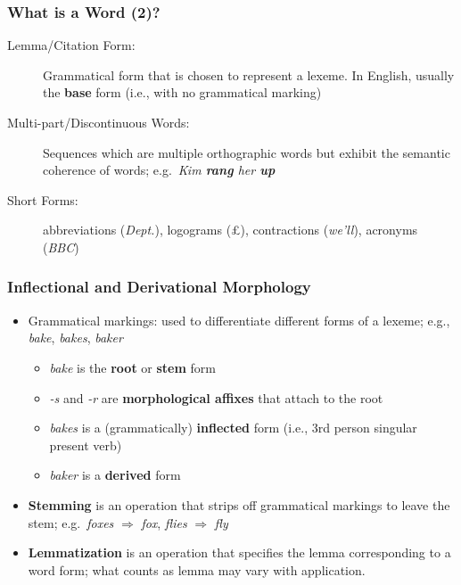 \begin{frame}[fragile]
  \frametitle{What is a Word (2)?}

    \begin{description}
      \item[Lemma/Citation Form:] Grammatical form that is chosen to
        represent a lexeme. In English, usually the \textbf{base} form
        (i.e., with no grammatical marking)

      \item[Multi-part/Discontinuous Words:] Sequences which are
        multiple orthographic words but exhibit the semantic coherence
        of words; e.g.\ \textit{Kim
          \textbf{rang} her \textbf{up}}

        \item[Short Forms:] abbreviations (\textit{Dept.}), logograms
        (\pounds), contractions (\textit{we'll}), acronyms (\textit{BBC})
    \end{description}
 
\end{frame}

\begin{frame}[fragile]
  \frametitle{Inflectional and Derivational Morphology}

  \begin{itemize}
    \item Grammatical markings: used to differentiate different forms
      of a lexeme; e.g., \textit{bake}, \textit{bakes}, \textit{baker}
 

      \begin{itemize}
      \item \textit{bake} is the \textbf{root} or \textbf{stem}
        form
      \item \textit{-s} and \textit{-r} are \textbf{morphological
          affixes} that attach to the root
      \item \textit{bakes} is a (grammatically) \textbf{inflected}
        form (i.e., 3rd person singular present verb)
      \item \textit{baker} is a \textbf{derived} form
      \end{itemize}

    \item \textbf{Stemming} is an operation that strips off
      grammatical markings to leave the stem; e.g.\ \textit{foxes}
      $\Rightarrow$ \textit{fox},  \textit{flies}
      $\Rightarrow$ \textit{fly}

    \item \textbf{Lemmatization} is an operation that specifies the
      lemma corresponding to a word form; what counts as lemma may
      vary with application.
    \end{itemize}
\end{frame}

